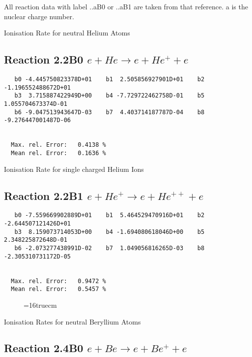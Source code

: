\documentclass[12pt]{article}
\begin{document}
All reaction data with label ..aB0 or ..aB1 are taken from that
reference. a is the nuclear charge number.

Ionisation Rate for neutral Helium Atoms



\subsection{
Reaction 2.2B0   $e + He \rightarrow e + He^+ + e $
}
\begin{small}\begin{verbatim}
   b0 -4.445750823378D+01    b1  2.505856927901D+01    b2 -1.196552488672D+01
   b3  3.715887422949D+00    b4 -7.729722462758D-01    b5  1.055704673374D-01
   b6 -9.047513943647D-03    b7  4.403714187787D-04    b8 -9.276447001487D-06


  Max. rel. Error:   0.4138 %
  Mean rel. Error:   0.1636 %
\end{verbatim}\end{small}

  Ionisation Rate for single charged Helium Ions

\subsection{
Reaction 2.2B1   $e + He^+ \rightarrow e + He^{++} + e$
}


\begin{small}\begin{verbatim}
   b0 -7.559669902889D+01    b1  5.464529470916D+01    b2 -2.644507121426D+01
   b3  8.159073714053D+00    b4 -1.694080618046D+00    b5  2.348225872648D-01
   b6 -2.073277438991D-02    b7  1.049056816265D-03    b8 -2.305310731172D-05


  Max. rel. Error:   0.9472 %
  Mean rel. Error:   0.5457 %

\end{verbatim}\end{small}

\begin{figure} \label{2.2B}
\epsfxsize=16truecm
\end{figure}
\newpage

 Ionisation Rates for neutral Beryllium Atoms

\subsection{
Reaction 2.4B0   $e + Be \rightarrow e + Be^+ + e $
}
\end{document}

